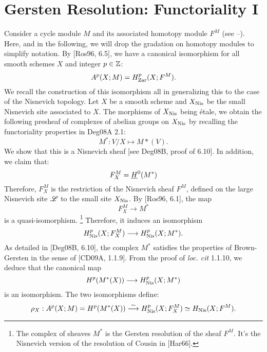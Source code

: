 \section{Gersten Resolution: Functoriality I}

Consider a cycle module $M$ and its associated homotopy module 
$F^M$ (see --). Here, and in the following, we will drop the 
gradation on homotopy modules to simplify notation. By 
[Ros96, 6.5], we have a canonical isomorphism for all smooth 
schemes $X$ and integer $p \in \mathbb{Z}$:
\[
A^p(X; M) = H_{\mathrm{Zar}}^p(X; F^M).
\]
We recall the construction of this isomorphism all in generalizing
this to the case of the Nisnevich topology. Let $X$ be a smooth 
scheme and $X_{\mathrm{Nis}}$ be the small Nisnevich site associated to 
$X$. The morphisms of $X_{\mathrm{Nis}}$ being \'etale, we obtain the 
following presheaf of complexes of abelian groups on $X_{\mathrm{Nis}}$ 
by recalling the functoriality properties in Deg08A 2.1:
\[
M^*: V/X \mapsto M*(V).
\]
We show that this is a Nisnevich sheaf [see Deg08B, proof of 6.10].
In addition, we claim that:
\[
F^M_X = \underline{H}^0(M^*)
\]
Therefore, $F^M_X$ is the restriction of the Nisnevich sheaf $F^M$,
defined on the large Nisnevich site $\mathscr{L}$ to the small site
$X_{\mathrm{Nis}}$. By [Ros96, 6.1], the map
\[
F^M_X \to M^*
\]
is a quasi-isomorphism. \footnote{The complex of sheaves $M^*$ is 
the Gersten resolution of the sheaf $F^M$. It's the Nisnevich 
version of the resolution of Cousin in [Har66].} Therefore, it 
induces an isomorphism
\[
H_{\mathrm{Nis}}^p(X; F^M_X) \longrightarrow H_{\mathrm{Nis}}^p(X; M^*).
\]
As detailed in [Deg08B, 6.10], the complex $M^*$ satisfies the
properties of Brown-Gersten in the sense of [CD09A, 1.1.9]. From 
the proof of \emph{loc. cit} 1.1.10, we deduce that the canonical
map
\[
H^p(M^*(X)) \longrightarrow H_{\mathrm{Nis}}^p(X; M^*)
\]
is an isomorphism. The two isomorphisms define:
\begin{equation}
\rho_X: A^p(X; M) = H^p(M^*(X)) \stackrel{\sim}{\longrightarrow}
   H_{\mathrm{Nis}}^p(X; F^M_X) \simeq H_{\mathrm{Nis}}(X; F^M).
\end{equation}

